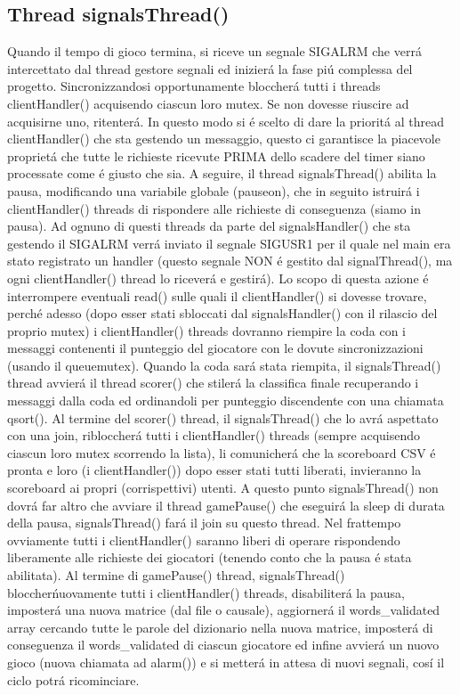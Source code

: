  \subsection{Thread signalsThread()}

Quando il tempo di gioco termina, si riceve un segnale SIGALRM che verr\'a intercettato dal thread gestore segnali ed inizier\'a la fase pi\'u complessa del progetto. Sincronizzandosi opportunamente bloccher\'a tutti i threads clientHandler() acquisendo ciascun loro mutex. Se non dovesse riuscire ad acquisirne uno, ritenter\'a. In questo modo si \'e scelto di dare la priorit\'a al thread clientHandler() che sta gestendo un messaggio, questo ci garantisce la piacevole propriet\'a che tutte le richieste ricevute PRIMA dello scadere del timer siano processate come \'e giusto che sia. A seguire, il thread signalsThread() abilita la pausa, modificando una variabile globale (pauseon), che in seguito istruir\'a i clientHandler() threads di rispondere alle richieste di conseguenza (siamo in pausa). Ad ognuno di questi threads da parte del signalsHandler() che sta gestendo il SIGALRM verr\'a inviato il segnale SIGUSR1 per il quale nel main era stato registrato un handler (questo segnale NON \'e gestito dal signalThread(), ma ogni clientHandler() thread lo ricever\'a e gestir\'a). Lo scopo di questa azione \'e interrompere eventuali read() sulle quali il clientHandler() si dovesse trovare, perch\'e adesso (dopo esser stati sbloccati dal signalsHandler() con il rilascio del proprio mutex) i clientHandler() threads dovranno riempire la coda con i messaggi contenenti il punteggio del giocatore con le dovute sincronizzazioni (usando il queuemutex). Quando la coda sar\'a stata riempita, il signalsThread() thread avvier\'a il thread scorer() che stiler\'a la classifica finale recuperando i messaggi dalla coda ed ordinandoli per punteggio discendente con una chiamata qsort(). Al termine del scorer() thread, il signalsThread() che lo avr\'a aspettato con una join, ribloccher\'a tutti i clientHandler() threads (sempre acquisendo ciascun loro mutex scorrendo la lista), li comunicher\'a che la scoreboard CSV \'e pronta e loro (i clientHandler()) dopo esser stati tutti liberati, invieranno la scoreboard ai propri (corrispettivi) utenti. A questo punto signalsThread() non dovr\'a far altro che avviare il thread gamePause() che eseguir\'a la sleep di durata della pausa, signalsThread() far\'a il join su questo thread. Nel frattempo ovviamente tutti i clientHandler() saranno liberi di operare rispondendo liberamente alle richieste dei giocatori (tenendo conto che la pausa \'e stata abilitata). Al termine di gamePause() thread, signalsThread() bloccher\' nuovamente tutti i clientHandler() threads, disabiliter\'a la pausa, imposter\'a una nuova matrice (dal file o causale), aggiorner\'a il words\_validated array cercando tutte le parole del dizionario nella nuova matrice, imposter\'a di conseguenza il words\_validated di ciascun giocatore ed infine avvier\'a un nuovo gioco (nuova chiamata ad alarm()) e si metter\'a in attesa di nuovi segnali, cos\'i il ciclo potr\'a ricominciare.

